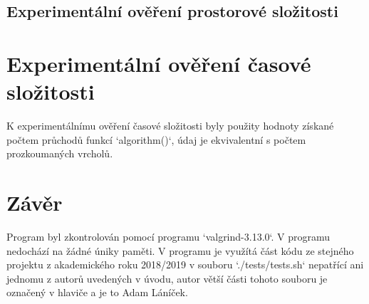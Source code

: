 \documentclass[a4paper,11pt]{article}
\begin{document}

\newpage
\subsection{Experimentální ověření prostorové složitosti}

\begin{figure}[h]
\centering
{}
\end{figure}


\section{Experimentální ověření časové složitosti}

K experimentálnímu ověření časové složitosti byly použity hodnoty získané počtem průchodů funkcí `algorithm()`, údaj je ekvivalentní s počtem prozkoumaných vrcholů.

\begin{figure}[h]
\centering
{}
\end{figure}
\newpage
\section{Závěr}

Program byl zkontrolován pomocí programu `valgrind-3.13.0`. V programu nedochází na žádné úniky paměti. V programu je využítá část kódu ze stejného projektu z akademického roku 2018/2019 v souboru `./tests/tests.sh` nepatřící ani jednomu z autorů uvedených v úvodu, autor větší části tohoto souboru je označený v hlaviče a je to Adam Láníček.






\end{document}
